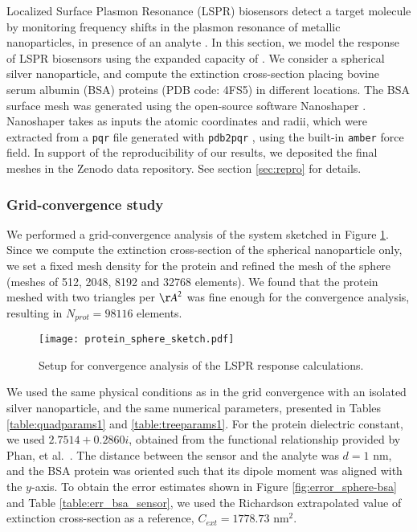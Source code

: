 Localized Surface Plasmon Resonance (LSPR) biosensors detect a target molecule by monitoring
frequency shifts in the plasmon resonance of metallic nanoparticles, in presence of an analyte \cite{WilletsVandyune2007}.
In this section, we model the response of LSPR biosensors using the expanded capacity of \pygbe.
We consider a spherical silver nanoparticle, and compute the extinction cross-section placing 
bovine serum albumin (BSA) proteins (PDB code: 4FS5) in different locations.
The BSA surface mesh was generated using the open-source software Nanoshaper \cite{Nanoshaper}. 
Nanoshaper takes as inputs the atomic coordinates and radii, which were 
extracted from a \texttt{pqr} file generated with \texttt{pdb2pqr} \cite{Dolinsky04},
 using the built-in \texttt{amber} force field.
 In support of the reproducibility of our results, we deposited the final meshes in the Zenodo data repository.
See section \ref{sec:repro} for details.

\subsubsection{Grid-convergence study} \label{sec:bsa_convergence}
We performed a grid-convergence 
analysis of the system sketched in Figure \ref{fig:setup_conv}. 
Since we compute the extinction cross-section of the spherical nanoparticle only, we 
set a fixed mesh density for the protein and refined the mesh of the
sphere (meshes of 512, 2048, 8192 and 32768 elements). We found that the protein meshed with two
triangles per ${\AA}^2$ was fine enough for the convergence analysis, resulting in $N_{prot} = 98116$ elements. 


\begin{figure}[h] %
   \centering
   \texttt{[image: protein\_sphere\_sketch.pdf]} 
   \caption{Setup for convergence analysis of the LSPR response calculations.}
   \label{fig:setup_conv}
\end{figure}

We used the same physical conditions as in the grid convergence with an isolated silver nanoparticle, and the same numerical parameters, presented in Tables \ref{table:quadparams1} and \ref{table:treeparams1}.
For the protein dielectric constant, we used $2.7514 + 0.2860i$, obtained from the 
functional relationship provided by Phan, et al.~\cite{PhanETal2013}.
The distance between the sensor and the analyte was $d=1$ nm, 
and the BSA protein was oriented such that its dipole moment was aligned with the $y$-axis. 
To obtain the error estimates shown in Figure \ref{fig:error_sphere-bsa} and Table \ref{table:err_bsa_sensor},
we used the Richardson extrapolated value of extinction cross-section as a reference, 
$C_{ext}= 1778.73$ nm$^2$.


